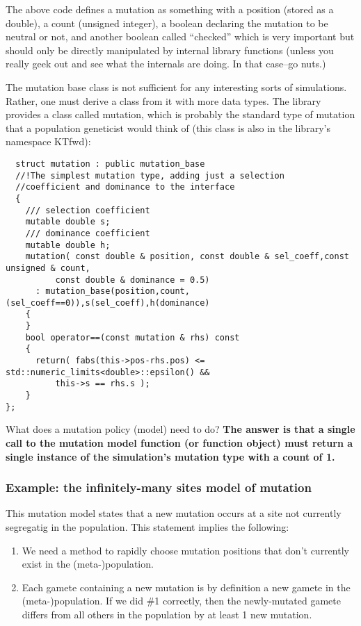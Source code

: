 \documentclass{article}
\begin{document}
The above code defines a mutation as something with a position (stored as a double), a count (unsigned integer), a boolean declaring the mutation to be neutral or not, and another boolean called ``checked'' which is very important but should only be directly manipulated by internal library functions (unless you really geek out and see what the internals are doing.  In that case--go nuts.)

The mutation base class is not sufficient for any interesting sorts of simulations.  Rather, one must derive a class from it with more data types.  The library provides a class called mutation, which is probably the standard type of mutation that a population geneticist would think of (this class is also in the library's namespace KTfwd):

\begin{lstlisting}
  struct mutation : public mutation_base
  //!The simplest mutation type, adding just a selection 
  //coefficient and dominance to the interface
  {
    /// selection coefficient
    mutable double s;
    /// dominance coefficient
    mutable double h;
    mutation( const double & position, const double & sel_coeff,const unsigned & count,
	      const double & dominance = 0.5) 
      : mutation_base(position,count,(sel_coeff==0)),s(sel_coeff),h(dominance)
    {
    }
    bool operator==(const mutation & rhs) const
    {
      return( fabs(this->pos-rhs.pos) <= std::numeric_limits<double>::epsilon() &&
	      this->s == rhs.s );
    }
};
\end{lstlisting}

What does a mutation policy (model) need to do?  \textbf{The answer is that a single call to the mutation model function (or function object) must return a single instance of the simulation's mutation type with a count of 1.}

\subsubsection{Example: the infinitely-many sites model of mutation}
This mutation model states that a new mutation occurs at a site not currently segregatig in the population.  This statement implies the following:
\begin{enumerate}
\item We need a method to rapidly choose mutation positions that don't currently exist in the (meta-)population.
\item Each gamete containing a new mutation is by definition a new gamete in the (meta-)population.  If we did \#1 correctly, then the newly-mutated gamete differs from all others in the population by at least 1 new mutation.
\end{enumerate}
\end{document}
